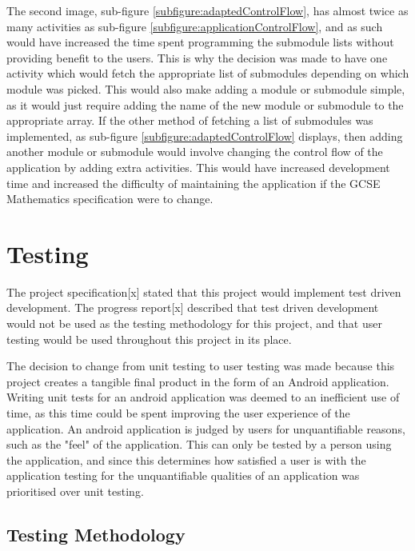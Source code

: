 \documentclass{article}
\begin{document}
The second image, sub-figure \ref{subfigure:adaptedControlFlow}, has almost twice as many activities as sub-figure \ref{subfigure:applicationControlFlow}, and as such would have increased the time spent programming the submodule lists without providing benefit to the users. This is why the decision was made to have one activity which would fetch the appropriate list of submodules depending on which module was picked. This would also make adding a module or submodule simple, as it would just require adding the name of the new module or submodule to the appropriate array. If the other method of fetching a list of submodules was implemented, as sub-figure \ref{subfigure:adaptedControlFlow} displays, then adding another module or submodule would involve changing the control flow of the application by adding extra activities. This would have increased development time and increased the difficulty of maintaining the application if the GCSE Mathematics specification were to change.


\section{Testing}
\label{section:testing}

The project specification[x] stated that this project would implement test driven development. The progress report[x] described that test driven development would not be used as the testing methodology for this project, and that user testing would be used throughout this project in its place. \par

The decision to change from unit testing to user testing was made because this project creates a tangible final product in the form of an Android application. Writing unit tests for an android application was deemed to an inefficient use of time, as this time could be spent improving the user experience of the application. An android application is judged by users for unquantifiable reasons, such as the "feel" of the application. This can only be tested by a person using the application, and since this determines how satisfied a user is with the application testing for the unquantifiable qualities of an application was prioritised over unit testing. \par

\subsection{Testing Methodology}
\end{document}
